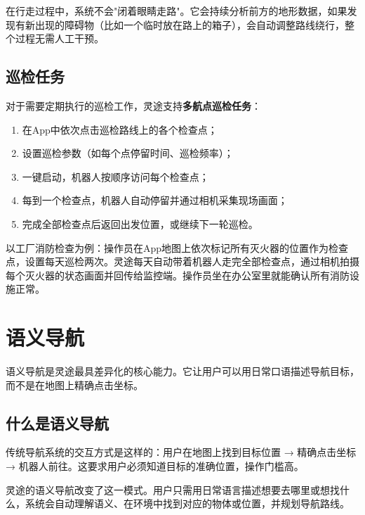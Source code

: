 \documentclass[a4paper, 12pt, openany]{book}
\begin{document}
在行走过程中，系统不会"闭着眼睛走路"。它会持续分析前方的地形数据，如果发现有新出现的障碍物（比如一个临时放在路上的箱子），会自动调整路线绕行，整个过程无需人工干预。

\section{巡检任务}

对于需要定期执行的巡检工作，灵途支持\textbf{多航点巡检任务}：

\begin{enumerate}[leftmargin=2em, itemsep=4pt]
  \item 在App中依次点击巡检路线上的各个检查点；
  \item 设置巡检参数（如每个点停留时间、巡检频率）；
  \item 一键启动，机器人按顺序访问每个检查点；
  \item 每到一个检查点，机器人自动停留并通过相机采集现场画面；
  \item 完成全部检查点后返回出发位置，或继续下一轮巡检。
\end{enumerate}

\begin{infobox}[典型巡检场景]
以工厂消防检查为例：操作员在App地图上依次标记所有灭火器的位置作为检查点，设置每天巡检两次。灵途每天自动带着机器人走完全部检查点，通过相机拍摄每个灭火器的状态画面并回传给监控端。操作员坐在办公室里就能确认所有消防设施正常。
\end{infobox}


\chapter{语义导航}

语义导航是灵途最具差异化的核心能力。它让用户可以用日常口语描述导航目标，而不是在地图上精确点击坐标。

\section{什么是语义导航}

传统导航系统的交互方式是这样的：用户在地图上找到目标位置 → 精确点击坐标 → 机器人前往。这要求用户必须知道目标的准确位置，操作门槛高。

灵途的语义导航改变了这一模式。用户只需用日常语言描述想要去哪里或想找什么，系统会自动理解语义、在环境中找到对应的物体或位置，并规划导航路线。
\end{document}
